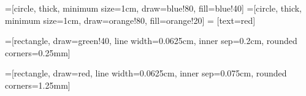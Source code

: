 =[circle,
                                    thick,
                                    minimum size=1cm,
                                    draw=blue!80,
                                    fill=blue!40]
=[circle,
                                    thick,
                                    minimum size=1cm,
                                    draw=orange!80,
                                    fill=orange!20]
 = [text=red]

=[rectangle,
                                                draw=green!40,
                                                line width=0.0625cm,
                                                inner sep=0.2cm,
                                                rounded corners=0.25mm]

=[rectangle,
draw=red,
line width=0.0625cm,
inner sep=0.075cm,
rounded corners=1.25mm]

